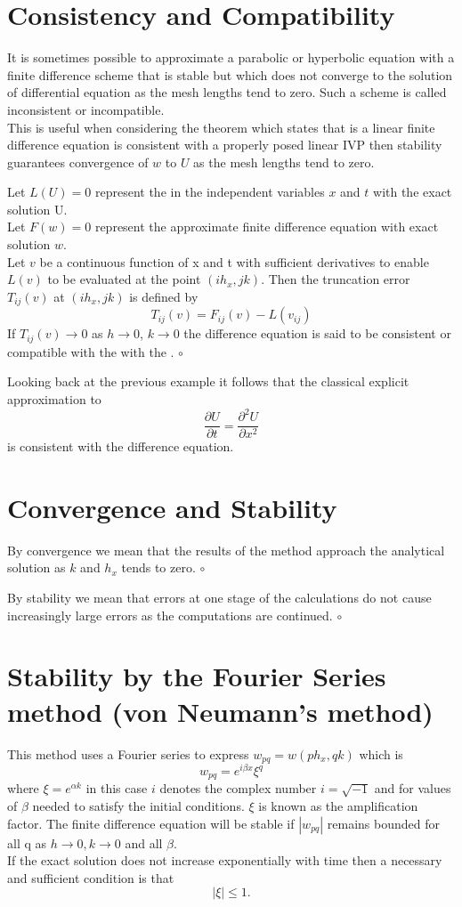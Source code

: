\section{Consistency and Compatibility}
It is sometimes possible to approximate a parabolic or hyperbolic equation with a
finite difference scheme that is stable but which does not converge to the solution
of differential equation as the mesh lengths tend to zero.  Such a scheme is called inconsistent or incompatible.\\
This is useful when considering the theorem which states that is a linear finite
difference equation is consistent with a properly posed linear IVP then stability guarantees convergence of $w$ to $U$ as the mesh lengths tend to zero.

\begin{definition}
Let $L(U)=0$ represent the  in the independent variables $x$ and $t$ with
the exact solution U.\\
Let $F(w)=0$ represent the approximate finite difference equation with exact 
solution $w$.\\
Let $v$ be a continuous function of x and t with sufficient derivatives to enable
$L(v)$ to be evaluated at the point $(ih_x,jk)$.  Then the truncation error $T_{ij}(v)$ at $ (ih_x,jk)$ is defined by
\[T_{ij}(v)=F_{ij}(v)-L(v_{ij})\]
If $T_{ij}(v) \rightarrow 0$ as $h \rightarrow 0$,  $k \rightarrow 0$
the difference equation is said to be consistent or compatible with the with the .
$\circ$
\end{definition}
Looking back at the previous example it follows that the classical explicit approximation to 
\[\frac{\partial U}{\partial t} = \frac{\partial^2 U}{\partial x^2} \]
is consistent with the difference equation.
\section{Convergence and Stability}
\begin{definition}
By convergence we mean that the results of the method approach the analytical solution as $k$ and $h_x$ tends to zero.
$\circ$
\end{definition}
\begin{definition}
By stability we mean that errors at one stage of the calculations do not cause
increasingly large errors as  the computations are continued.
$\circ$
\end{definition}
\section{Stability by the Fourier Series method (von Neumann's method)}
This method uses a Fourier series to express $w_{pq}=w(ph_x,qk)$
which is
\[ w_{pq}=e^{i\beta x}\xi^{q} \]
where $\xi=e^{\alpha k}$ in this case $i$ denotes the complex number
$i=\sqrt{-1}$ and for values of $\beta$ needed to satisfy the initial conditions.
$\xi$ is known as the amplification factor.
The finite difference equation will be stable if $|w_{pq}|$ remains bounded for all q as $h \rightarrow 0, k\rightarrow 0$ and all $\beta$.\\
If the exact solution does not increase exponentially with time then a necessary
and sufficient condition is that 
\[ |\xi|\leq 1. \]
